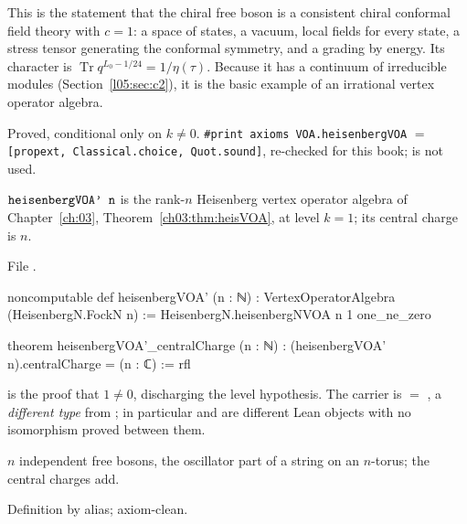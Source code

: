 \begin{physics}
This is the statement that the chiral free boson is a consistent chiral conformal field theory with $c=1$:
a space of states, a vacuum, local fields for every state, a stress tensor generating the conformal symmetry,
and a grading by energy. Its character is $\operatorname{Tr}q^{L_0-1/24}=1/\eta(\tau)$. Because it has a
continuum of irreducible modules (Section~\ref{l05:sec:c2}), it is the basic example of an irrational
vertex operator algebra.
\end{physics}

\begin{status}
Proved, conditional only on $k\neq0$. \texttt{\#print axioms VOA.heisenbergVOA} $=$
\texttt{[propext, Classical.choice, Quot.sound]}, re-checked for this book;  is not used.
\end{status}

\begin{definition}\label{l05:def:heisN}
$\lean{heisenbergVOA' n}$ is the rank-$n$ Heisenberg vertex operator algebra of Chapter~\ref{ch:03},
Theorem~\ref{ch03:thm:heisVOA}, at level $k=1$; its central charge is $n$.
\end{definition}

\noindent File .
\begin{leancode}
noncomputable def heisenbergVOA' (n : ℕ) : VertexOperatorAlgebra (HeisenbergN.FockN n) :=
  HeisenbergN.heisenbergNVOA n 1 one_ne_zero

theorem heisenbergVOA'_centralCharge (n : ℕ) :
    (heisenbergVOA' n).centralCharge = (n : ℂ) := rfl
\end{leancode}

\begin{dictionary}
 is the proof that $1\ne0$, discharging the level hypothesis. The carrier is
 $=$ , a \emph{different type} from ; in
particular  and  are different Lean objects with no
isomorphism proved between them.
\end{dictionary}

\begin{physics}
$n$ independent free bosons, the oscillator part of a string on an $n$-torus; the central charges add.
\end{physics}

\begin{status}
Definition by alias; axiom-clean.
\end{status}

